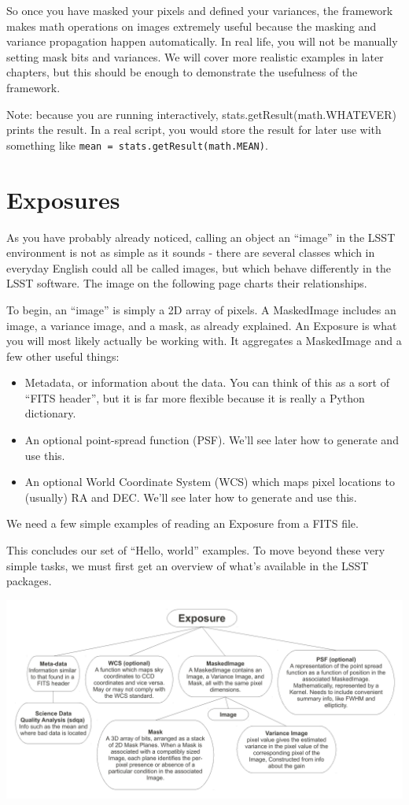So once you have masked your pixels and defined your variances, the
framework makes math operations on images extremely useful because
the masking and variance propagation happen automatically.  In real
life, you will not be manually setting mask bits and variances.  We
will cover more realistic examples in later chapters, but this should
be enough to demonstrate the usefulness of the framework.

Note: because you are running interactively,
stats.getResult(math.WHATEVER) prints the result.  In a real script,
you would store the result for later use with something like
\texttt{mean = stats.getResult(math.MEAN)}.


\section{Exposures}

As you have probably already noticed, calling an object an ``image''
in the LSST environment is not as simple as it sounds - there are
several classes which in everyday English could all be called images,
but which behave differently in the LSST software.  The image on the
following page charts their relationships.

To begin, an ``image'' is simply a 2D array of pixels. A MaskedImage
includes an image, a variance image, and a mask, as already explained.
An Exposure is what you will most likely actually be working with.  It
aggregates a MaskedImage and a few other useful things: 
\begin{itemize}
\item Metadata, or information about the data.  You can think of this
  as a sort of ``FITS header'', but it is far more flexible because it
  is really a Python dictionary.
\item An optional point-spread function (PSF).  We'll see later how to
  generate and use this.
\item An optional World Coordinate System (WCS) which maps pixel
  locations to (usually) RA and DEC. We'll see later how to generate
  and use this.
\end{itemize}

We need a few simple examples of reading an Exposure from a FITS file.

This concludes our set of ``Hello, world'' examples.  To move beyond
these very simple tasks, we must first get an overview of what's
available in the LSST packages.

\includegraphics[angle=90,scale=0.5]{./figures/exposure.pdf}




